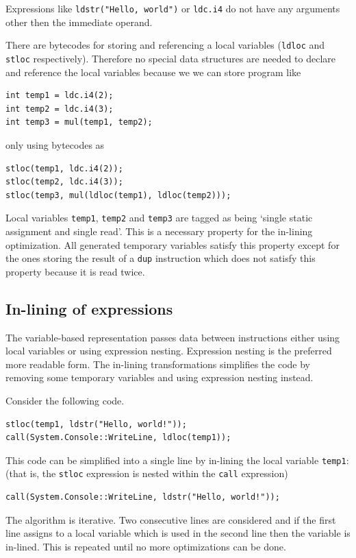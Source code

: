 \documentclass[12pt,twoside,notitlepage]{report}
\begin{document}
Expressions like \verb|ldstr("Hello, world")| or \verb|ldc.i4|
do not have any arguments other then the immediate operand.

There are bytecodes for storing and referencing a local variables
(\verb|ldloc| and \verb|stloc| respectively).
Therefore no special data structures are needed to declare
and reference the local variables because we we can store 
program like
\begin{verbatim}
int temp1 = ldc.i4(2);
int temp2 = ldc.i4(3);
int temp3 = mul(temp1, temp2);
\end{verbatim}
only using bytecodes as
\begin{verbatim}
stloc(temp1, ldc.i4(2));
stloc(temp2, ldc.i4(3));
stloc(temp3, mul(ldloc(temp1), ldloc(temp2)));
\end{verbatim}

Local variables \verb|temp1|, \verb|temp2| and \verb|temp3| 
are tagged as being `single static assignment and single read'.
This is a necessary property for the in-lining optimization.
All generated temporary variables satisfy this property
except for the ones storing the result of a \verb|dup| instruction 
which does not satisfy this property because it is read twice.

\subsection{In-lining of expressions}
     \label{In-lining of expressions}

The variable-based representation passes data between instructions
either using local variables or using expression nesting.
Expression nesting is the preferred more readable form.
The in-lining transformations simplifies the code by removing
some temporary variables and using expression nesting instead.

Consider the following code.
\begin{verbatim}
stloc(temp1, ldstr("Hello, world!"));
call(System.Console::WriteLine, ldloc(temp1));
\end{verbatim}
This code can be simplified into a single line by in-lining the
local variable \verb|temp1|:
(that is, the \verb|stloc| expression is nested within the
\verb|call| expression)
\begin{verbatim}
call(System.Console::WriteLine, ldstr("Hello, world!"));
\end{verbatim}

The algorithm is iterative.  Two consecutive lines are considered
and if the first line assigns to a local variable which is used
in the second line then the variable is in-lined.
This is repeated until no more optimizations can be done.
\end{document}
